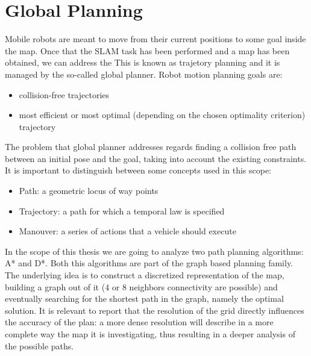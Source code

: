 \section{Global Planning}
Mobile robots are meant to move from their current positions to some goal inside the map.
Once that the SLAM task has been performed and a map has been obtained, we can address the This is known as trajetory planning and it is managed by the so-called global planner.
Robot motion planning goals are:
\begin{itemize}
    \item collision-free trajectories
    \item most efficient or most optimal (depending on the chosen optimality criterion) trajectory
\end{itemize}
The problem that global planner addresses regards finding a collision free path between an initial pose and the goal, taking into account the existing constraints.
It is important to distinguish between some concepts used in this scope:
\begin{itemize}
    \item Path: a geometric locus of way points
    \item Trajectory: a path for which a temporal law is specified
    \item Manouver: a series of actions that a vehicle should execute
\end{itemize}

In the scope of this thesis we are going to analyze two path planning algorithms: A* and D*.
Both this algorithms are part of the graph based planning family.
The underlying idea is to construct a discretized representation of the map, building a graph out of it (4 or 8 neighbors connectivity are possible) and eventually searching for the shortest path in the graph, namely the optimal solution. It is relevant to report that the resolution of the grid directly influences the accuracy of the plan: a more dense resolution will describe in a more complete way the map it is investigating, thus resulting in a deeper analysis of the possible paths.

